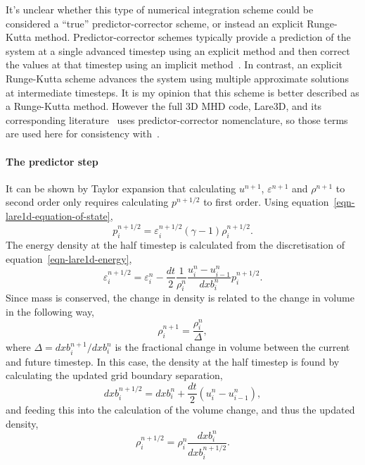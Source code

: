 It's unclear whether this type of numerical integration scheme could be considered a ``true'' predictor-corrector scheme, or instead an explicit Runge-Kutta method. Predictor-corrector schemes typically provide a prediction of the system at a single advanced timestep using an explicit method and then correct the values at that timestep using an implicit method~\cite{butcherNumericalMethodsOrdinary2004}. In contrast, an explicit Runge-Kutta scheme advances the system using multiple approximate solutions at intermediate timesteps. It is my opinion that this scheme is better described as a Runge-Kutta method. However the full 3D MHD code, Lare3D, and its corresponding literature~\cite{arberStaggeredGridLagrangian2001} uses predictor-corrector nomenclature, so those terms are used here for consistency with~\cite{arberStaggeredGridLagrangian2001}.

\paragraph{The predictor step}
It can be shown by Taylor expansion that calculating $u^{n+1}$, $\varepsilon^{n+1}$ and $\rho^{n+1}$ to second order only requires calculating $p^{n+1/2}$ to first order. Using equation~\eqref{eqn-lare1d-equation-of-state},
\begin{equation}
  p_i^{n+1/2} = \varepsilon_i^{n+1/2}(\gamma-1)\rho_i^{n+1/2}.
  \label{eqn-predictor-pressure}
\end{equation}
The energy density at the half timestep is calculated from the discretisation of equation~\eqref{eqn-lare1d-energy},
\begin{equation}
  \varepsilon_i^{n+1/2} = \varepsilon_i^{n} - \frac{dt}{2} \frac{1}{\rho_i^n} \frac{u_i^n - u_{i-1}^n}{dxb_i^n}p_i^{n+1/2}.
  \label{eqn-predictor-energy}
\end{equation}
Since mass is conserved, the change in density is related to the change in volume in the following way,
\begin{equation}
  \rho_i^{n+1} = \frac{\rho_i^{n}}{\Delta},
\end{equation}
where $\Delta = dxb_i^{n+1}/dxb_i^{n}$ is the fractional change in volume between the current and future timestep. In this case, the density at the half timestep is found by calculating the updated grid boundary separation,
\begin{equation}
  dxb_i^{n+1/2} = dxb_i^n + \frac{dt}{2}(u_i^n - u_{i-1}^n),
  \label{eqn-predictor-boundary-distance}
\end{equation}
and feeding this into the calculation of the volume change, and thus the updated density,
\begin{equation}
  \rho_i^{n+1/2} = \rho_i^n \frac{dxb_i^n}{dxb_i^{n+1/2}}.
  \label{eqn-predictor-density}
\end{equation}

